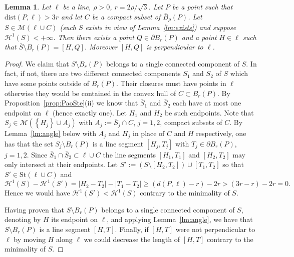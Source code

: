 \documentclass{amsart}
\renewcommand{\H}{\mathcal H}
\newcommand{\abs}[1]{\left\vert #1 \right\vert}
\newcommand{\ENCLOSE}[1]{\left\{#1\right\}}
\newcommand{\St}{\mathrm{St}}
\newcommand{\M}{\mathcal{M}}
\renewcommand{\H}{\mathcal{H}}
\newcommand{\dist}{\mathrm{dist}}
\newtheorem{lemma}[theorem]{Lemma}
\theoremstyle{definition}
\theoremstyle{remark}
\begin{document}
\begin{lemma}\label{lm:base}
  Let $\ell$ be a line, $\rho>0$, 
  $r=2\rho/\sqrt 3$.
  Let $P$ be a point such that $\dist(P,\ell)>3r$
  and let $C$ be a compact subset of $\bar B_\rho(P)$.
  Let $S \in \M(\ell\cup C)$ 
  (such $S$ exists in view of Lemma~\ref{lm:exists})
  and suppose $\H^1(S)<+\infty$.
  Then there exists a point $Q\in \partial B_r(P)$ 
  and a point $H\in \ell$
  such that $\bar S\setminus B_r(P) = [H,Q]$.
  Moreover $[H,Q]$ is perpendicular to $\ell$.
\end{lemma}
\begin{proof}
  We claim that $S\setminus B_r(P)$ belongs to 
  a single connected component of $S$. 
  In fact, if not, there are two different connected components 
  $S_1$ and $S_2$ of $S$ which have some points outside of 
  $B_r(P)$. 
  Their closures must have points in $\ell$ otherwise 
  they would be contained in the convex hull of $C\subset B_r(P)$.
  By Proposition~\ref{prop:PaoSte}(ii) we know  
  that $\bar S_1$ and $\bar S_2$ each have 
  at most one endpoint on $\ell$ (hence exactly one).
  Let $H_1$ and $H_2$ be such endpoints.
  Note that $S_j\in \M(\ENCLOSE{H_j}\cup A_j)$ 
  with $A_j:=\bar S_j\cap C$, $j=1,2$, compact subsets of $C$. 
  By Lemma~\ref{lm:angle} below
  with $A_j$ and $H_j$ in place of $C$ and $H$ respectively,
  one has that
  the set $S_j\setminus B_r(P)$ is a line segment $[H_j,T_j]$
  with $T_j\in \partial B_r(P)$, $j=1,2$.
  Since $\bar S_1\cap \bar S_2\subset \ell\cup C$ 
  the line segments $[H_1,T_1]$ and $[H_2,T_2]$ may only intersect at their endpoints.
  Let $S':=(S\setminus [H_2,T_2])\cup[T_1,T_2]$ so that 
  $S'\in \St(\ell\cup C)$ and
  \[
    \H^1(S) - \H^1(S')
    = \abs{H_2 - T_2} - \abs{T_1 - T_2}
    \ge (d(P,\ell)-r) - 2r 
    > (3r-r) - 2r = 0. 
  \]
  Hence we would have $\H^1(S')<\H^1(S)$ contrary to the minimality of $S$.

  Having proven that $S\setminus B_r(P)$ belongs to a single 
  connected component of $S$, 
  denoting by $H$ its endpoint on $\ell$,
  and applying Lemma~\ref{lm:angle}, we have that 
  $S\setminus B_r(P)$ is a line segment $[H,T]$.
  Finally, if $[H,T]$ were not perpendicular to $\ell$ by moving $H$ along $\ell$ 
  we could decrease the length of $[H,T]$ contrary to the minimality 
  of $S$.
\end{proof}
  
\end{document}
